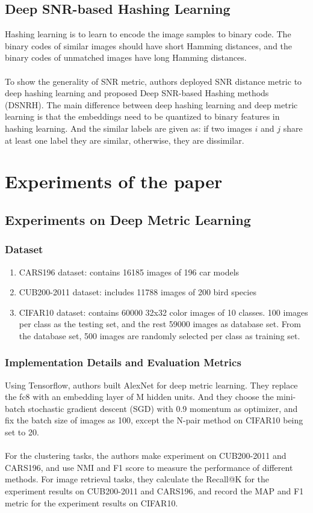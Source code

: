 \documentclass[12pt,paper=a4]{scrartcl}
\theoremstyle{break}
\begin{document}
\subsection{Deep SNR-based Hashing Learning}
Hashing learning is to learn to encode the image samples to binary code. The binary codes of similar images should have short Hamming distances, and the binary codes of unmatched images have long Hamming distances. \\ \\
To show the generality of SNR metric, authors deployed SNR distance metric to deep hashing learning and proposed Deep SNR-based Hashing methods (DSNRH). The main difference between deep hashing learning and deep metric learning is that the embeddings need to be quantized to binary features in hashing learning. And the similar labels are given as: if two images $i$ and $j$ share at least one label they are similar, otherwise, they are dissimilar.
\section{Experiments of the paper}
\subsection{Experiments on Deep Metric Learning}
\subsubsection{Dataset}
\begin{enumerate}
\item CARS196 dataset: contains 16185 images of 196 car models
\item CUB200-2011 dataset: includes 11788 images of 200 bird species
\item CIFAR10 dataset: contains 60000 32x32 color images of 10 classes. 100 images per class as the testing set, and the rest 59000 images as database set. From the database set, 500 images are randomly selected per class as training set.
\end{enumerate}
\subsubsection{Implementation Details and Evaluation Metrics}
Using Tensorflow, authors built AlexNet for deep metric learning. They replace the fc8 with an embedding layer of M hidden units. And they choose the mini-batch stochastic gradient descent (SGD) with 0.9 momentum as optimizer, and fix the batch size of images as 100, except the N-pair method on CIFAR10 being set to 20. \\ \\
For the clustering tasks, the authors make experiment on CUB200-2011 and CARS196, and use NMI and F1 score to measure the performance of different methods. For image retrieval tasks, they calculate the Recall@K for the experiment results on CUB200-2011 and CARS196, and record the MAP and F1 metric for the experiment results on CIFAR10.
\end{document}
